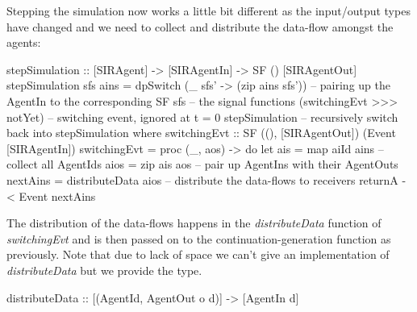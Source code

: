 Stepping the simulation now works a little bit different as the input/output types have changed and we need to collect and distribute the data-flow amongst the agents:

\begin{HaskellCode}
stepSimulation :: [SIRAgent] -> [SIRAgentIn] -> SF () [SIRAgentOut]
stepSimulation sfs ains =
    dpSwitch
      (\_ sfs' -> (zip ains sfs')) -- pairing up the AgentIn to the corresponding SF
      sfs                          -- the signal functions
      (switchingEvt >>> notYet)    -- switching event, ignored at t = 0
      stepSimulation               -- recursively switch back into stepSimulation
  where
    switchingEvt :: SF ((), [SIRAgentOut]) (Event [SIRAgentIn])
    switchingEvt = proc (_, aos) -> do
      let ais      = map aiId ains       -- collect all AgentIds
          aios     = zip ais aos         -- pair up AgentIns with their AgentOuts
          nextAins = distributeData aios -- distribute the data-flows to receivers
      returnA -< Event nextAins
\end{HaskellCode}

The distribution of the data-flows happens in the \textit{distributeData} function of \textit{switchingEvt} and is then passed on to the continuation-generation function as previously. Note that due to lack of space we can't give an implementation of \textit{distributeData} but we provide the type.

\begin{HaskellCode}
distributeData :: [(AgentId, AgentOut o d)] -> [AgentIn d]
\end{HaskellCode}

